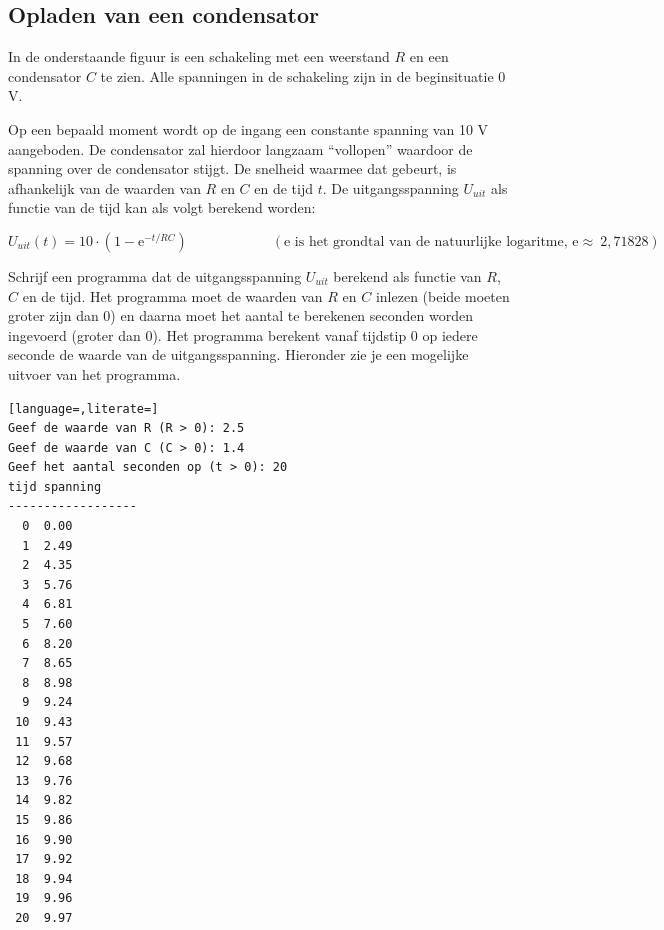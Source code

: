 \documentclass[a4paper,10pt,fleqn,twoside]{article}
\begin{document}
\subsection{Opladen van een condensator}
In de onderstaande figuur is een  schakeling met een weerstand $R$ en een condensator $C$ te zien.
Alle spanningen in de schakeling zijn in de beginsituatie 0 V.

\begin{figure}[H]
\centering
{}
\end{figure}

Op een bepaald moment wordt op de ingang een constante spanning van 10 V aangeboden. De condensator zal hierdoor langzaam ``vollopen'' waardoor de spanning over de condensator stijgt. De snelheid waarmee dat gebeurt, is afhankelijk van de waarden van $R$ en $C$ en de tijd $t$.
De uitgangsspanning $U_{uit}$ als functie van de tijd kan als volgt berekend worden:

\begin{equation*}
U_{uit}(t) = 10\cdot(1-\mathrm{e}^{-t/RC}) \qquad\qquad\qquad (\text{e is het grondtal van de natuurlijke logaritme, e}\approx\ 2,71828)
\end{equation*}


Schrijf een programma dat de uitgangsspanning $U_{uit}$ berekend als functie van $R$, $C$ en de tijd. Het programma moet de waarden van $R$ en $C$ inlezen (beide moeten groter zijn dan 0) en daarna moet het aantal te berekenen seconden worden ingevoerd (groter dan 0). Het programma berekent vanaf tijdstip 0 op iedere seconde de waarde van de uitgangsspanning. Hieronder zie je een mogelijke uitvoer van het programma.

\begin{lstlisting}[language=,literate=]
Geef de waarde van R (R > 0): 2.5
Geef de waarde van C (C > 0): 1.4
Geef het aantal seconden op (t > 0): 20
tijd spanning
------------------
  0  0.00
  1  2.49
  2  4.35
  3  5.76
  4  6.81
  5  7.60
  6  8.20
  7  8.65
  8  8.98
  9  9.24
 10  9.43
 11  9.57
 12  9.68
 13  9.76
 14  9.82
 15  9.86
 16  9.90
 17  9.92
 18  9.94
 19  9.96
 20  9.97
\end{lstlisting}
\end{document}
